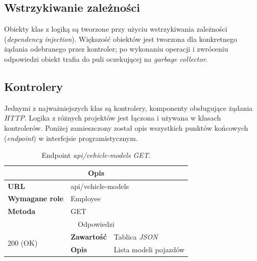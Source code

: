\documentclass[eng,printmode,openany]{mgr}
\begin{document}
	\subsection{Wstrzykiwanie zależności}
	Obiekty klas z logiką są tworzone przy użyciu wstrzykiwania zależności (\textit{dependency injection}). Większość obiektów jest tworzona dla konkretnego żądania odebranego przez kontroler; po wykonaniu operacji i zwróceniu odpowiedzi obiekt trafia do puli oczekującej na \textit{garbage collector}.
	
	\subsection{Kontrolery}
	Jednymi z najważniejszych klas są kontrolery, komponenty obsługujące żądania \textit{HTTP}. Logika z różnych projektów jest łączona i używana w klasach kontrolerów. 
	Poniżej zamieszczony został opis wszystkich punktów końcowych (\textit{endpoint}) w interfejsie programistycznym.
	\begin{table}[H]
	\caption{Endpoint \textit{api/vehicle-models GET}.}
	\begin{tabularx}{\textwidth}{|l|l|X|}
		\hline
		\multicolumn{3}{|c|}{\textbf{\textbf{Opis}}}
		\\ \hline
		\textbf{URL}                         & \multicolumn{2}{l|}{api/vehicle-models}
		\\ \hline
		\textbf{Wymagane role}               & \multicolumn{2}{l|}{Employee}
		\\ \hline
		\textbf{Metoda}                      & \multicolumn{2}{l|}{GET}
		\\ \hline
		\multicolumn{3}{|c|}{ Odpowiedzi}
		\\ \hline
		\multirow{2}{*}{200 (OK)}   & \textbf{Zawartość}         & Tablica \textit{JSON}
		\\ \cline{2-3}              & \textbf{Opis}         	    & Lista modeli pojazdów
		\\ \hline
	\end{tabularx}
\end{table}
\end{document}
